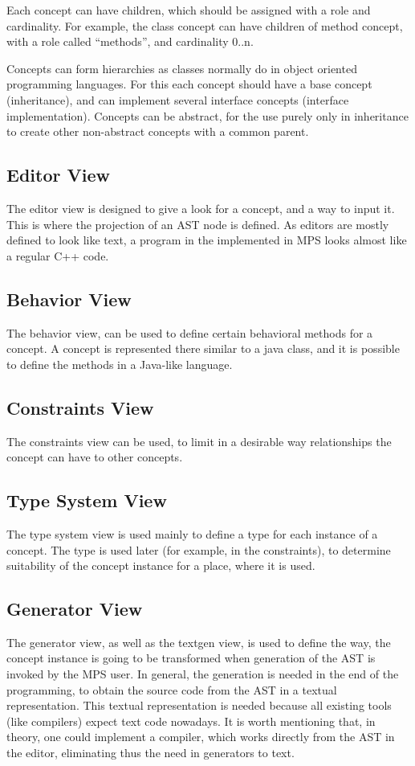 Each concept can have children, which should be assigned with a role and cardinality. For example, the class concept can have children of method concept,
with a role called ``methods'', and cardinality 0..n.

Concepts can form hierarchies as classes normally do in object oriented programming languages. For this each concept should have a base concept (inheritance),
and can implement several interface concepts (interface implementation). Concepts can be abstract, for the use purely only in inheritance to create other 
non-abstract concepts with a common parent.

\subsection{Editor View}

The editor view is designed to give a look for a concept, and a way to input it. This is where the projection of an AST node is defined. As editors 
are mostly defined to look like text, a program in the \cpppl implemented in MPS looks almost like a regular C++ code.

\subsection{Behavior View}
The behavior view, can be used to define certain behavioral methods for a concept. A concept is represented there similar to a java class, and
it is possible to define the methods in a Java-like language.

\subsection{Constraints View}
The constraints view can be used, to limit in a desirable way relationships the concept can have to other concepts.

\subsection{Type System View}
The type system view is used mainly to define a type for each instance of a concept. The type is used later (for example, in the constraints), to 
determine suitability of the concept instance for a place, where it is used.

\subsection{Generator View}
The generator view, as well as the textgen view, is used to define the way, the concept instance is going to be transformed when generation of the AST
is invoked by the MPS user. In general, the generation is needed in the end of the programming, to obtain the source code from the AST in a textual representation.
This textual representation is needed because all existing tools (like compilers) expect text code nowadays. It is worth mentioning that, in theory, one
could implement a compiler, which works directly from the AST in the editor, eliminating thus the need in generators to text.

